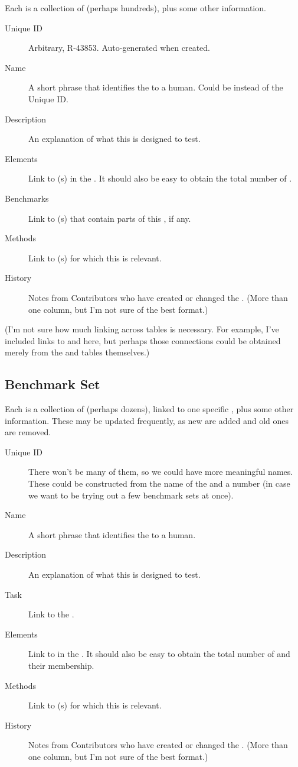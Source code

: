 Each \Refset is a collection of \Elements (perhaps hundreds), plus some other information.

\begin{description}
    \item[Unique ID] Arbitrary, \eg R-43853.  Auto-generated when created.
    \item[Name] A short phrase that identifies the \Refset to a human.  Could be instead of the Unique ID.
    \item[Description] An explanation of what this \Refset is designed to test.
    \item[Elements] Link to \Element(s) in the \Refset.  It should also be easy to obtain the total number of \Elements.
    \item[Benchmarks] Link to \Benchmark(s) that contain parts of this \Refset, if any.
    \item[Methods] Link to \Method(s) for which this \Refset is relevant.
    \item[History] Notes from Contributors who have created or changed the \Refset.  (More than one column, but I'm not sure of the best format.)
\end{description}

(I'm not sure how much linking across tables is necessary.
For example, I've included links to \Benchmark and \Method here, but perhaps those connections could be obtained merely from the \Benchmark and \Method tables themselves.)

\subsection{Benchmark Set}
\label{sec:tables_benchmark}

Each \Benchmark is a collection of \Elements (perhaps dozens), linked to one specific \Task, plus some other information.
These may be updated frequently, as new \Elements are added and old ones are removed.

\begin{description}
    \item[Unique ID] There won't be many of them, so we could have more meaningful names.  These could be constructed from the name of the \Task and a number (in case we want to be trying out a few benchmark sets at once).
    \item[Name] A short phrase that identifies the \Benchmark to a human.
    \item[Description] An explanation of what this \Benchmark is designed to test.
    \item[Task] Link to the \Task.
    \item[Elements] Link to \Element in the \Benchmark.  It should also be easy to obtain the total number of \Elements and their \Refset membership.
    \item[Methods] Link to \Method(s) for which this \Benchmark is relevant.
    \item[History] Notes from Contributors who have created or changed the \Benchmark.  (More than one column, but I'm not sure of the best format.)
\end{description}

